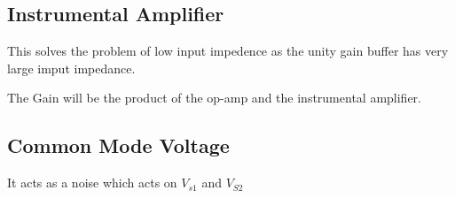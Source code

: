 \documentclass[12pt]{article}
\begin{document}
\begin{itemize}
\subsection{Instrumental Amplifier}
This solves the problem of low input impedence as the unity gain buffer has very large imput impedance.

The Gain will be the product of the op-amp and the instrumental amplifier.
\subsection{Common Mode Voltage}
It acts as a noise which acts on $V_{s1}$ and $V_{S2}$
\end{itemize}
\end{document}
